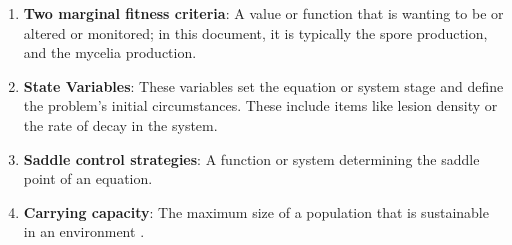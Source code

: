 \documentclass[11pt]{amsart}
\begin{document}
\begin{enumerate}
    \item\label{term:marginal} \textbf{Two marginal fitness criteria}: A value or function that is wanting to be or altered or monitored; in this document, it is typically the spore production, and the mycelia production.
    \item\label{term:statevariables} \textbf{State Variables}: These variables set the equation or system stage and define the problem's initial circumstances. These include items like lesion density or the rate of decay in the system.
    \item\label{term:saddlecontrol} \textbf{Saddle control strategies}: A function or system determining the saddle point of an equation.
    \item\label{term:carryingcapacity} \textbf{Carrying capacity}: The maximum size of a population that is sustainable in an environment \cite{carryingcapacity}.
    
\end{enumerate}
\end{document}
